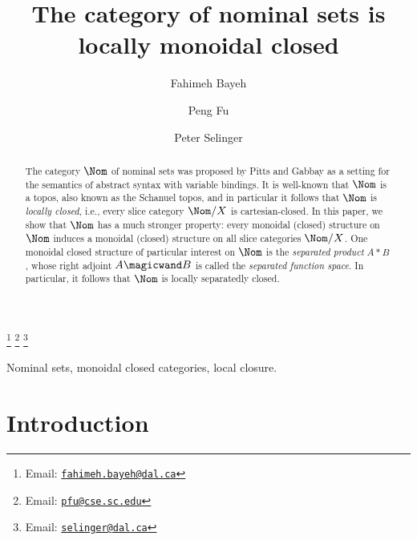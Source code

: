 \documentclass[twoside,11pt]{entics}
\begin{document}
\begin{frontmatter}
  \title{The category of nominal sets is locally monoidal closed}
  \author{Fahimeh Bayeh}
  \author{Peng Fu}
  \author{Peter Selinger}
  \address[a]{Department of Mathematics and Statistics\\Dalhousie
    University\\Halifax, Nova Scotia, Canada}
  \address[b]{Department of Computer Science and Engineering\\University
    of South Carolina\\Columbia, South Carolina, U.S.A.}
  \thanks[fahimeh.bayeh@dal.ca]{Email: \href{mailto:fahimeh.bayeh@dal.ca} 
    {\texttt{\normalshape fahimeh.bayeh@dal.ca}}}
  \thanks[pfu@cse.sc.edu]{Email: \href{mailto:pfu@cse.sc.edu} 
    {\texttt{\normalshape pfu@cse.sc.edu}}}
  \thanks[selinger@dal.ca]{Email: \href{mailto:selinger@dal.ca} 
    {\texttt{\normalshape selinger@dal.ca}}}
  
  \begin{abstract}
    The category $\Nom$ of nominal sets was proposed by Pitts and Gabbay
    as a setting for the semantics of abstract syntax with variable
    bindings. It is well-known that $\Nom$ is a topos, also known as the
    Schanuel topos, and in particular it follows that $\Nom$ is
    \emph{locally closed}, i.e., every slice category $\Nom/X$ is
    cartesian-closed. In this paper, we show that $\Nom$ has a much
    stronger property: every monoidal (closed) structure on $\Nom$
    induces a monoidal (closed) structure on all slice categories
    $\Nom/X$. One monoidal closed structure of particular interest on
    $\Nom$ is the \emph{separated product} $A\ast B$, whose right adjoint
    $A\magicwand B$ is called the \emph{separated function space}. In
    particular, it follows that $\Nom$ is locally separatedly closed.
  \end{abstract}
  
\begin{keyword}
  Nominal sets, monoidal closed categories, local closure.
\end{keyword}
\end{frontmatter}

\section{Introduction}
\end{document}
